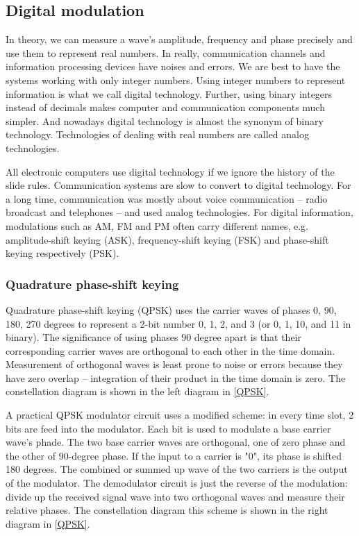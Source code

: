 \documentclass{book}
\begin{document}
\subsection{Digital modulation}
In theory, we can measure a wave's amplitude, frequency and phase precisely and use them to represent real numbers. In really, communication channels and information processing devices have noises and errors. We are best to have the systems working with only integer numbers. Using integer numbers to represent information is what we call digital technology. Further, using binary integers instead of decimals makes computer and communication components much simpler. And nowadays digital technology is almost the synonym of binary technology. Technologies of dealing with real numbers are called analog technologies.

All electronic computers use digital technology if we ignore the history of the slide rules. Communication systems are slow to convert to digital technology. For a long time, communication was mostly about voice communication -- radio broadcast and telephones -- and used analog technologies. For digital information, modulations such as AM, FM and PM often carry different names, e.g. amplitude-shift keying (ASK), frequency-shift keying (FSK) and phase-shift keying respectively (PSK).

\subsubsection{Quadrature phase-shift keying}
 Quadrature phase-shift keying (QPSK) uses the carrier waves of phases 0, 90, 180, 270 degrees to represent a 2-bit number 
0, 1, 2, and 3 
(or 0, 1, 10, and 11 in binary). The significance of using phases 90 degree apart is that their corresponding carrier 
waves are orthogonal to each other in the time domain. Measurement of orthogonal waves is least prone to noise or errors 
because they have zero overlap -- integration of their product in the time domain is zero. 
The constellation diagram is shown in the left diagram in \ref{QPSK}.
 
 A practical QPSK modulator circuit\cite{qpsk-circuits} uses a modified scheme: in every time slot, 2 bits are feed into the modulator.
Each bit is used to modulate a base carrier wave's phade. The two base carrier waves are orthogonal, one of zero phase and the other of 90-degree phase. If the input to a carrier is "0", its phase is shifted 180 degrees. The combined or summed up wave of the two carriers is the output of the modulator. The demodulator circuit is just the reverse of the modulation: divide up the received signal wave into two orthogonal waves and measure their relative phases. The constellation diagram this scheme is shown in the right diagram in \ref{QPSK}.
\end{document}
